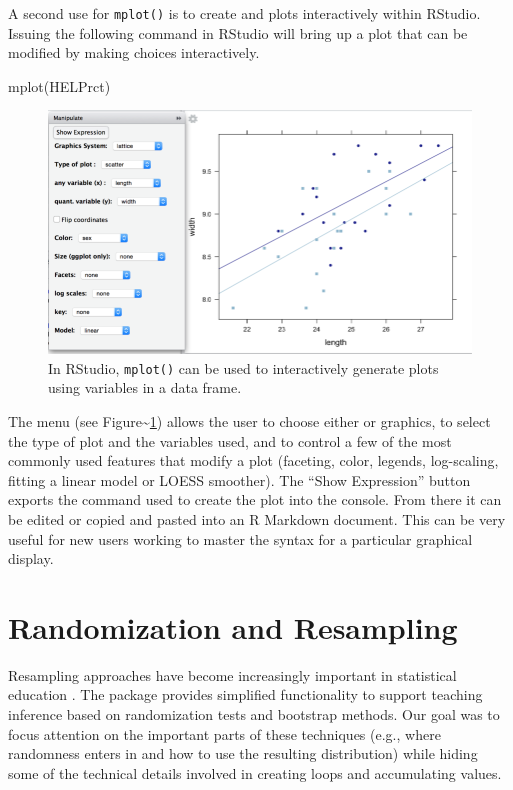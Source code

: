 A second use for \texttt{mplot()} is to create  and
 plots interactively within RStudio. Issuing the following
command in RStudio will bring up a plot that can be modified by making
choices interactively.

\begin{Schunk}
\begin{Sinput}
mplot(HELPrct)
\end{Sinput}
\end{Schunk}

\begin{figure}
\includegraphics{half-mplot.png}
\caption{In RStudio, \texttt{mplot()} can be used to interactively generate 
plots using variables in a data frame.}
\label{fig:mplot}
\end{figure}

\noindent
The menu (see Figure\textasciitilde{}\ref{fig:mplot}) allows the user to
choose either  or  graphics, to select the
type of plot and the variables used, and to control a few of the most
commonly used features that modify a plot (faceting, color, legends,
log-scaling, fitting a linear model or LOESS smoother). The ``Show
Expression'' button exports the command used to create the plot into the
console. From there it can be edited or copied and pasted into an R
Markdown document. This can be very useful for new users working to
master the syntax for a particular graphical display.

\section{Randomization and
Resampling}\label{randomization-and-resampling}

Resampling approaches have become increasingly important in statistical
education \citep{Tintle:TAS:2015, Hesterberg:2015}. The 
package provides simplified functionality to support teaching inference
based on randomization tests and bootstrap methods. Our goal was to
focus attention on the important parts of these techniques (e.g., where
randomness enters in and how to use the resulting distribution) while
hiding some of the technical details involved in creating loops and
accumulating values.

